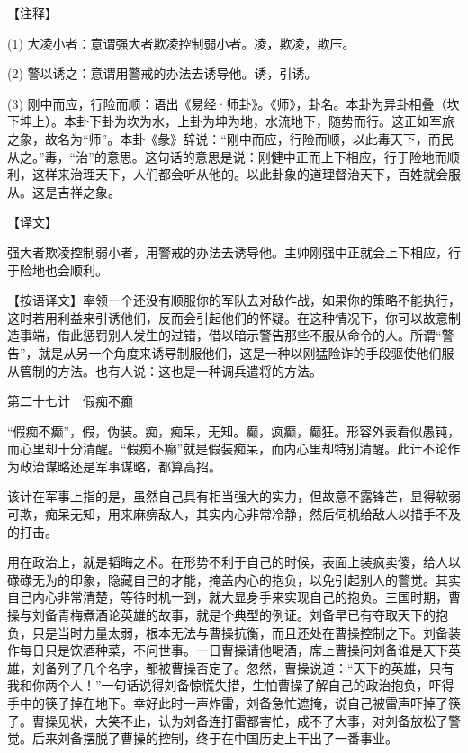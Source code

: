 \documentclass[12pt,UTF8]{ctexbook}
\begin{document}
【注释】


(1) 大凌小者：意谓强大者欺凌控制弱小者。凌，欺凌，欺压。

(2) 警以诱之：意谓用警戒的办法去诱导他。诱，引诱。

(3) 刚中而应，行险而顺：语出《易经·师卦》。《师》，卦名。本卦为异卦相叠（坎下坤上）。本卦下卦为坎为水，上卦为坤为地，水流地下，随势而行。这正如军旅之象，故名为“师”。本卦《彖》辞说：“刚中而应，行险而顺，以此毒天下，而民从之。”毒，“治”的意思。这句话的意思是说：刚健中正而上下相应，行于险地而顺利，这样来治理天下，人们都会听从他的。以此卦象的道理督治天下，百姓就会服从。这是吉祥之象。





【译文】


强大者欺凌控制弱小者，用警戒的办法去诱导他。主帅刚强中正就会上下相应，行于险地也会顺利。

【按语译文】率领一个还没有顺服你的军队去对敌作战，如果你的策略不能执行，这时若用利益来引诱他们，反而会引起他们的怀疑。在这种情况下，你可以故意制造事端，借此惩罚别人发生的过错，借以暗示警告那些不服从命令的人。所谓“警告”，就是从另一个角度来诱导制服他们，这是一种以刚猛险诈的手段驱使他们服从管制的方法。也有人说：这也是一种调兵遣将的方法。





第二十七计　假痴不癫


“假痴不癫”，假，伪装。痴，痴呆，无知。癫，疯癫，癫狂。形容外表看似愚钝，而心里却十分清醒。“假痴不癫”就是假装痴呆，而内心里却特别清醒。此计不论作为政治谋略还是军事谋略，都算高招。

该计在军事上指的是，虽然自己具有相当强大的实力，但故意不露锋芒，显得软弱可欺，痴呆无知，用来麻痹敌人，其实内心非常冷静，然后伺机给敌人以措手不及的打击。

用在政治上，就是韬晦之术。在形势不利于自己的时候，表面上装疯卖傻，给人以碌碌无为的印象，隐藏自己的才能，掩盖内心的抱负，以免引起别人的警觉。其实自己内心非常清楚，等待时机一到，就大显身手来实现自己的抱负。三国时期，曹操与刘备青梅煮酒论英雄的故事，就是个典型的例证。刘备早已有夺取天下的抱负，只是当时力量太弱，根本无法与曹操抗衡，而且还处在曹操控制之下。刘备装作每日只是饮酒种菜，不问世事。一日曹操请他喝酒，席上曹操问刘备谁是天下英雄，刘备列了几个名字，都被曹操否定了。忽然，曹操说道：“天下的英雄，只有我和你两个人！”一句话说得刘备惊慌失措，生怕曹操了解自己的政治抱负，吓得手中的筷子掉在地下。幸好此时一声炸雷，刘备急忙遮掩，说自己被雷声吓掉了筷子。曹操见状，大笑不止，认为刘备连打雷都害怕，成不了大事，对刘备放松了警觉。后来刘备摆脱了曹操的控制，终于在中国历史上干出了一番事业。
\end{document}
